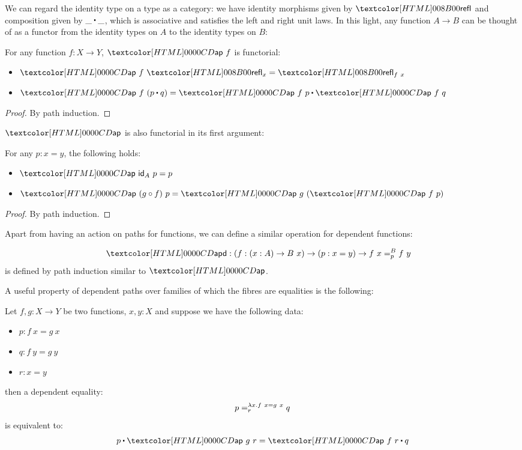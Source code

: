 We can regard the identity type on a type as a category: we have
identity morphisms given by $\refl$ and composition given by
$\trans{\_}{\_}$, which is associative and satisfies the left and
right unit laws. In this light, any function $A \to B$ can be thought
of as a functor from the identity types on $A$ to the identity types
on $B$:

\begin{proposition}
  For any function $f : X \to Y$, $\ap\ f$ is functorial:
  \begin{itemize}
  \item $\ap\ f\ \refl_x = \refl_{f\ x}$
  \item $\ap\ f\ (\trans{p}{q}) = \trans{\ap\ f\ p}{\ap\ f\ q}$
  \end{itemize}
\end{proposition}

\begin{proof}
  By path induction.
\end{proof}

$\ap$ is also functorial in its first argument:

\begin{proposition}
  For any $p : x = y$, the following holds:
  \begin{itemize}
  \item $\ap\ \id_A\ p = p$
  \item $\ap\ (g \circ f)\ p = \ap\ g\ (\ap\ f\ p)$
  \end{itemize}
\end{proposition}

\begin{proof}
  By path induction.
\end{proof}

Apart from having an action on paths for functions, we can define a
similar operation for dependent functions:

\begin{definition}
  \begin{align*}
    &\apd : (f : (x : A) \to B\ x) \to (p : x = y) \to \pathover{B}{p}{f\ x}{f\ y}
  \end{align*}
  is defined by path induction similar to $\ap$.
\end{definition}

A useful property of dependent paths over families of which the fibres
are equalities is the following:

\begin{proposition}
  Let $f, g : X \to Y$ be two functions, $x, y : X$ and suppose we
  have the following data:
  \begin{itemize}
  \item $p : f\ x = g\ x$
  \item $q : f\ y = g\ y$
  \item $r : x = y$
  \end{itemize}
  then a dependent equality:
  $$
  \pathover{\lambda x . f\ x = g\ x}{r}{p}{q}
  $$
  is equivalent to:
  $$
  p \ct \ap\ g\ r = \ap\ f\ r \ct q
  $$
\end{proposition}

